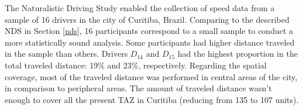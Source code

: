 
















The Naturalistic Driving Study enabled the collection of speed data from a sample of 16 drivers in the city of Curitiba, Brazil. Comparing to the described NDS in Section \ref{nds}, 16 participants correspond to a small sample to conduct a more statistically sound analysis. Some participants had higher distance traveled in the sample than others. Drivers $D_{14}$ and $D_{15}$ had the highest proportion in the total traveled distance:  19\% and 23\%, respectively. Regarding the spatial coverage, most of the traveled distance was performed in central areas of the city, in comparison to peripheral areas. The amount of traveled distance wasn't enough to cover all the present TAZ in Curitiba (reducing from 135 to 107 units).


